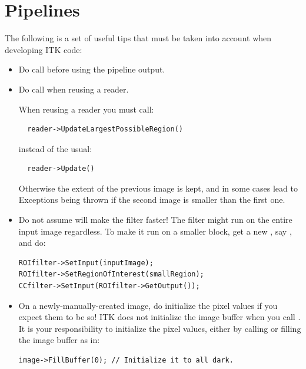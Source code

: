 \section{Pipelines}%
\label{sec:Pipelines}

The following is a set of useful tips that must be taken into account when
developing ITK code:
\begin{itemize}
\item Do call  before using the pipeline output.
\item Do call  when reusing a reader.

When reusing a reader you must call:

\small
\begin{verbatim}
  reader->UpdateLargestPossibleRegion()
\end{verbatim}
\normalsize

instead of the usual:

\small
\begin{verbatim}
  reader->Update()
\end{verbatim}
\normalsize

Otherwise the extent of the previous image is kept, and in some cases lead to Exceptions
being thrown if the second image is smaller than the first one.

\item Do not assume  will
make the filter faster! The filter might run on the entire input image
regardless. To make it run on a smaller block, get a new
, say , and do:

\small
\begin{verbatim}
ROIfilter->SetInput(inputImage);
ROIfilter->SetRegionOfInterest(smallRegion);
CCfilter->SetInput(ROIfilter->GetOutput());
\end{verbatim}
\normalsize

\item On a newly-manually-created image, do initialize the pixel values if you
expect them to be so! ITK does not initialize the image buffer when you call
. It is your responsibility to initialize the pixel values,
either by calling  or filling the image buffer as in:

\small
\begin{verbatim}
image->FillBuffer(0); // Initialize it to all dark.
\end{verbatim}
\normalsize

\end{itemize}

